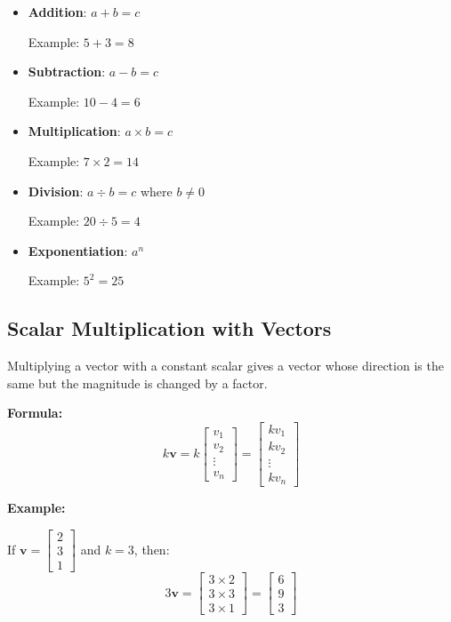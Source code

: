\documentclass[11pt,a4paper]{article}
\begin{document}
\begin{itemize}
    \item \textbf{Addition}: $a + b = c$
    
    Example: $5 + 3 = 8$
    
    \item \textbf{Subtraction}: $a - b = c$
    
    Example: $10 - 4 = 6$
    
    \item \textbf{Multiplication}: $a \times b = c$
    
    Example: $7 \times 2 = 14$
    
    \item \textbf{Division}: $a \div b = c$ where $b \neq 0$
    
    Example: $20 \div 5 = 4$
    
    \item \textbf{Exponentiation}: $a^n$
    
    Example: $5^2 = 25$
\end{itemize}

\subsection{Scalar Multiplication with Vectors}

Multiplying a vector with a constant scalar gives a vector whose direction is the same but the magnitude is changed by a factor.

\textbf{Formula:}
\begin{equation}
    k \mathbf{v} = k \begin{bmatrix} v_1 \\ v_2 \\ \vdots \\ v_n \end{bmatrix} = \begin{bmatrix} k v_1 \\ k v_2 \\ \vdots \\ k v_n \end{bmatrix}
\end{equation}

\textbf{Example:}

If $\mathbf{v} = \begin{bmatrix} 2 \\ 3 \\ 1 \end{bmatrix}$ and $k = 3$, then:
\begin{equation}
    3\mathbf{v} = \begin{bmatrix} 3 \times 2 \\ 3 \times 3 \\ 3 \times 1 \end{bmatrix} = \begin{bmatrix} 6 \\ 9 \\ 3 \end{bmatrix}
\end{equation}
\end{document}
